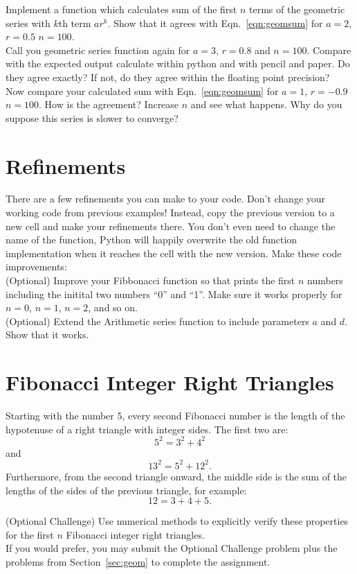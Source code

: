 \plot Implement a function  which calculates sum of the first $n$ terms of the geometric series with $k$th term $a r^k$.  Show that it agrees with Eqn.~\ref{eqn:geomsum} for $a=2$, $r=0.5$  $n=100$.
\\

\plot Call you geometric series function again for $a=3$, $r=0.8$ and $n=100$.  Compare with the expected output calculate within python and with pencil and paper.  Do they agree exactly?  If not, do they agree within the floating point precision?
\\

\plot Now compare your calculated sum with Eqn.~\ref{eqn:geomsum} for $a=1$, $r=-0.9$  $n=100$.  How is the agreement?  Increase $n$ and see what happens.  Why do you suppose this series is slower to converge?\\

\section{Refinements}

There are a few refinements you can make to your code.  Don't change
your working code from previous examples!  Instead, copy the previous
version to a new cell and make your refinements there.  You don't even
need to change the name of the function, Python will happily overwrite
the old function implementation when it reaches the cell with the new
version.  Make these code improvements:\\

\plot (Optional) Improve your Fibbonacci function so that prints the
first $n$ numbers including the initital two numbers ``0'' and ``1''.
Make sure it works properly for $n=0$, $n=1$, $n=2$, and so on.\\

\plot (Optional) Extend the Arithmetic series function to include
parameters $a$ and $d$.  Show that it works.\\

\section{Fibonacci Integer Right Triangles}

Starting with the number 5, every second Fibonacci number is the
length of the hypotenuse of a right triangle with integer sides.  The
first two are:
\begin{displaymath}
5^2 = 3^2 + 4^2  
\end{displaymath}
and 
\begin{displaymath}
13^2 = 5^2 + 12^2.  
\end{displaymath}
Furthermore, from the second triangle onward, the middle side is the sum of the lengths of the sides of the previous triangle, for example:
\begin{displaymath}
12 = 3 + 4 + 5.  
\end{displaymath}

\vskip 0.25cm
\plot (Optional Challenge) Use numerical methods to
explicitly verify these properties for the first $n$ Fibonacci integer
right triangles.\\

If you would prefer, you may submit the Optional Challenge problem plus the
problems from Section~\ref{sec:geom} to complete the assignment.
